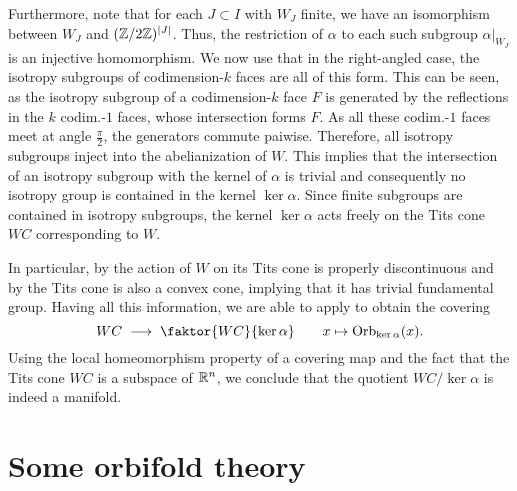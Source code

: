 Furthermore, note that for each \(J \subset I\) with \(W_J\) finite, we have an isomorphism between \(W_J\) and \((\mathbb{Z}/2\mathbb{Z})^{\left\vert J\right\vert}\).
Thus, the restriction of \(\alpha\) to each such subgroup \(\alpha\vert_{W_J}\) is an injective homomorphism.
We now use that in the right-angled case, the isotropy subgroups of codimension-\(k\) faces are all of this form.
This can be seen, as the isotropy subgroup of a codimension-\(k\) face \(F\) is generated by the reflections in the \(k\) codim.-\(1\) faces, whose intersection forms \(F\).
As all these codim.-\(1\) faces meet at angle \(\frac{\pi}{2}\), the generators commute paiwise.
Therefore, all isotropy subgroups inject into the abelianization of \(W\).
This implies that the intersection of an isotropy subgroup with the kernel of \(\alpha\) is trivial and consequently no isotropy group is contained in the kernel \(\ker\alpha\).
Since finite subgroups are contained in isotropy subgroups, the kernel \(\ker\alpha\) acts freely on the Tits cone \(WC\) corresponding to \(W\).

In particular, by  the action of \(W\) on its Tits cone is properly discontinuous and by  the Tits cone is also a convex cone, implying that it has trivial fundamental group.
Having all this information, we are able to apply  to obtain the covering
\[WC \;\longrightarrow\; \faktor{WC}{\ker\alpha} \qquad x \mapsto \text{Orb}_{\ker\alpha}(x).\]
Using the local homeomorphism property of a covering map and the fact that the Tits cone \(WC\) is a subspace of \(\mathbb{R}^n\), we conclude that the quotient \(WC/\ker\alpha\) is indeed a manifold.



\section{Some orbifold theory}

